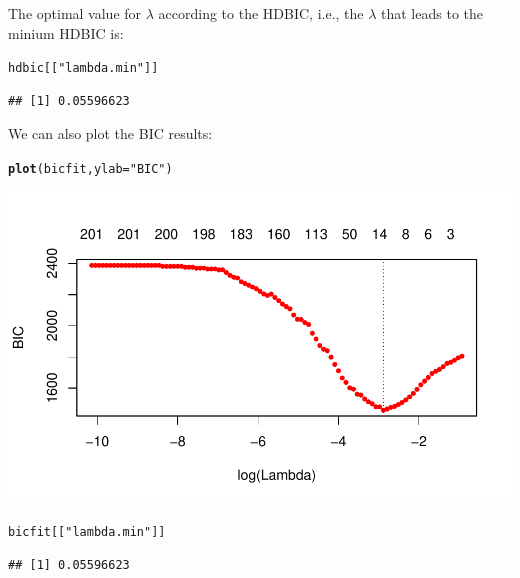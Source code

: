 \documentclass[12pt,letter]{article}\usepackage[]{graphicx}\usepackage[]{color}
\makeatletter
\newcommand{\hlstr}[1]{\textcolor[rgb]{0.192,0.494,0.8}{#1}}%
\newcommand{\hlstd}[1]{\textcolor[rgb]{0.345,0.345,0.345}{#1}}%
\newcommand{\hlkwc}[1]{\textcolor[rgb]{0.333,0.667,0.333}{#1}}%
\newcommand{\hlkwd}[1]{\textcolor[rgb]{0.737,0.353,0.396}{\textbf{#1}}}%
\newenvironment{kframe}{%
 \def\at@end@of@kframe{}%
 \ifinner\ifhmode%
  \def\at@end@of@kframe{\end{minipage}}%
  \begin{minipage}{\columnwidth}%
 \fi\fi%
 \def\FrameCommand##1{\hskip\@totalleftmargin \hskip-\fboxsep
 \colorbox{shadecolor}{##1}\hskip-\fboxsep
     \hskip-\linewidth \hskip-\@totalleftmargin \hskip\columnwidth}%
 \MakeFramed {\advance\hsize-\width
   \@totalleftmargin\z@ \linewidth\hsize
   \@setminipage}}%
 {\par\unskip\endMakeFramed%
 \at@end@of@kframe}
\newenvironment{knitrout}{}{} %
\makeatother
\begin{document}
The optimal value for $\lambda$ according to the HDBIC, i.e., the $\lambda$ that leads to the minium HDBIC is:

\begin{knitrout}\scriptsize
{}\color{fgcolor}\begin{kframe}
\begin{alltt}
\hlstd{hdbic[[}\hlstr{"lambda.min"}\hlstd{]]}
\end{alltt}
\begin{verbatim}
## [1] 0.05596623
\end{verbatim}
\end{kframe}
\end{knitrout}


We can also plot the BIC results:

\begin{knitrout}\scriptsize
{}\color{fgcolor}\begin{kframe}
\begin{alltt}
\hlkwd{plot}\hlstd{(bicfit,} \hlkwc{ylab} \hlstd{=} \hlstr{"BIC"}\hlstd{)}
\end{alltt}
\end{kframe}

{\centering \includegraphics[width=1\linewidth]{figure/unnamed-chunk-10-1} 

}


\begin{kframe}\begin{alltt}
\hlstd{bicfit[[}\hlstr{"lambda.min"}\hlstd{]]}
\end{alltt}
\begin{verbatim}
## [1] 0.05596623
\end{verbatim}
\end{kframe}
\end{knitrout}
\end{document}
